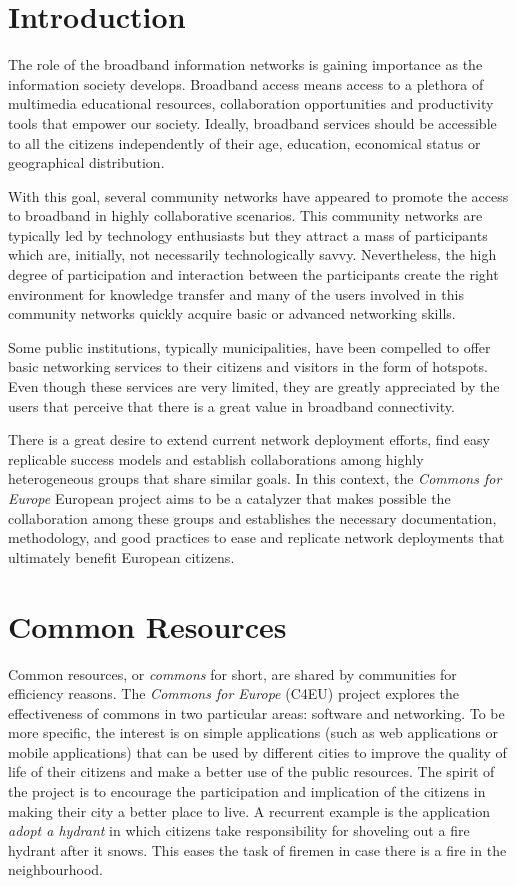\documentclass[conference]{IEEEtran}
\begin{document}
\section{Introduction}
The role of the broadband information networks is gaining importance as the information society develops.
Broadband access means access to a plethora of multimedia educational resources, collaboration opportunities and productivity tools that empower our society.
Ideally, broadband services should be accessible to all the citizens independently of their age, education, economical status or geographical distribution.

With this goal, several community networks have appeared to promote the access to broadband in highly collaborative scenarios.
This community networks are typically led by technology enthusiasts but they attract a mass of participants which are, initially, not necessarily technologically savvy. 
Nevertheless, the high degree of participation and interaction between the participants create the right environment for knowledge transfer and many of the users involved in this community networks quickly acquire basic or advanced networking skills.

Some public institutions, typically municipalities, have been compelled to offer basic networking services to their citizens and visitors in the form of hotspots.
Even though these services are very limited, they are greatly appreciated by the users that perceive that there is a great value in broadband connectivity.

There is a great desire to extend current network deployment efforts, find easy replicable success models and establish collaborations among highly heterogeneous groups that share similar goals.
In this context, the \emph{Commons for Europe} European project aims to be a catalyzer that makes possible the collaboration among these groups and establishes the necessary documentation, methodology, and good practices to ease and replicate network deployments that ultimately benefit European citizens.

\section{Common Resources}
Common resources, or \emph{commons} for short, are shared by communities for efficiency reasons.
The \emph{Commons for Europe} (C4EU) project explores the effectiveness of commons in two particular areas: software and networking.
To be more specific, the interest is on simple applications (such as web applications or mobile applications) that can be used by different cities to improve the quality of life of their citizens and make a better use of the public resources.
The spirit of the project is to encourage the participation and implication of the citizens in making their city a better place to live.
A recurrent example is the application \emph{adopt a hydrant} in which citizens take responsibility for shoveling out a fire hydrant after it snows.
This eases the task of firemen in case there is a fire in the neighbourhood.
\end{document}
